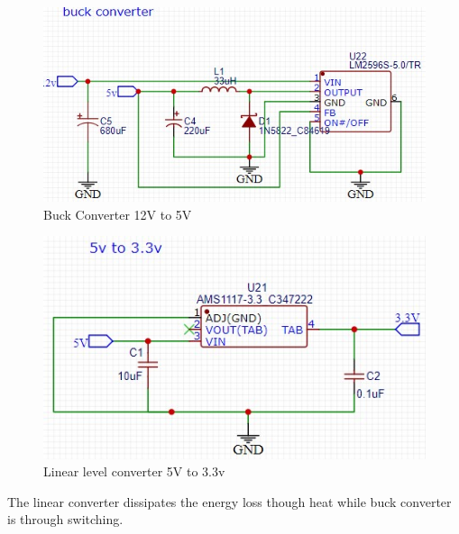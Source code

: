 \begin{center}
	\begin{figure}[H]
		\centering
		\includegraphics{Figures/buck}
		\caption[Buck converter]{Buck Converter 12V to 5V}
	\end{figure}
\end{center}

\begin{center}
	\begin{figure}[H]
		\centering
		\includegraphics{Figures/5233}
		\caption[Linear Voltage Converter]{Linear level converter 5V to 3.3v}
	\end{figure}
\end{center}
The linear converter dissipates the energy loss though heat while buck converter is through switching.

